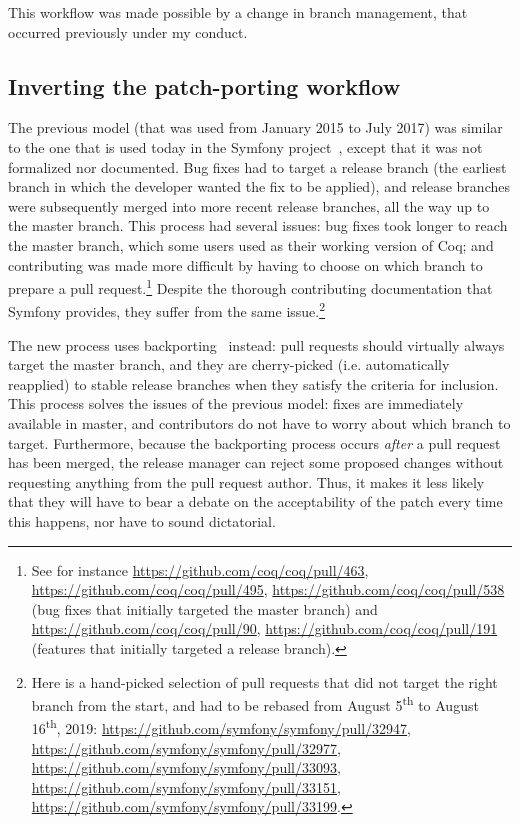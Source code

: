 This workflow was made possible by a change in branch management, that occurred previously under my conduct.

\subsection{Inverting the patch-porting workflow}

The previous model (that was used from January 2015 to July 2017) was similar to the one that is used today in the Symfony project~\cite[Section ``Choose the right Branch'']{symfony_pull_request}, except that it was not formalized nor documented.
Bug fixes had to target a release branch (the earliest branch in which the developer wanted the fix to be applied), and release branches were subsequently merged into more recent release branches, all the way up to the master branch.
This process had several issues: bug fixes took longer to reach the master branch, which some users used as their working version of Coq; and contributing was made more difficult by having to choose on which branch to prepare a pull request.\footnote{See for instance \url{https://github.com/coq/coq/pull/463}, \url{https://github.com/coq/coq/pull/495}, \url{https://github.com/coq/coq/pull/538} (bug fixes that initially targeted the master branch) and \url{https://github.com/coq/coq/pull/90}, \url{https://github.com/coq/coq/pull/191} (features that initially targeted a release branch).}
Despite the thorough contributing documentation that Symfony provides, they suffer from the same issue.\footnote{
	Here is a hand-picked selection of pull requests that did not target the right branch from the start, and had to be rebased from August 5\textsuperscript{th} to August 16\textsuperscript{th}, 2019: \url{https://github.com/symfony/symfony/pull/32947}, \url{https://github.com/symfony/symfony/pull/32977}, \url{https://github.com/symfony/symfony/pull/33093}, \url{https://github.com/symfony/symfony/pull/33151}, \url{https://github.com/symfony/symfony/pull/33199}.
}

The new process uses backporting~\cite{hua2014case} instead: pull requests should virtually always target the master branch, and they are cherry-picked (i.e. automatically reapplied) to stable release branches when they satisfy the criteria for inclusion.
This process solves the issues of the previous model: fixes are immediately available in master, and contributors do not have to worry about which branch to target.
Furthermore, because the backporting process occurs \emph{after} a pull request has been merged, the release manager can reject some proposed changes without requesting anything from the pull request author.
Thus, it makes it less likely that they will have to bear a debate on the acceptability of the patch every time this happens, nor have to sound dictatorial.

